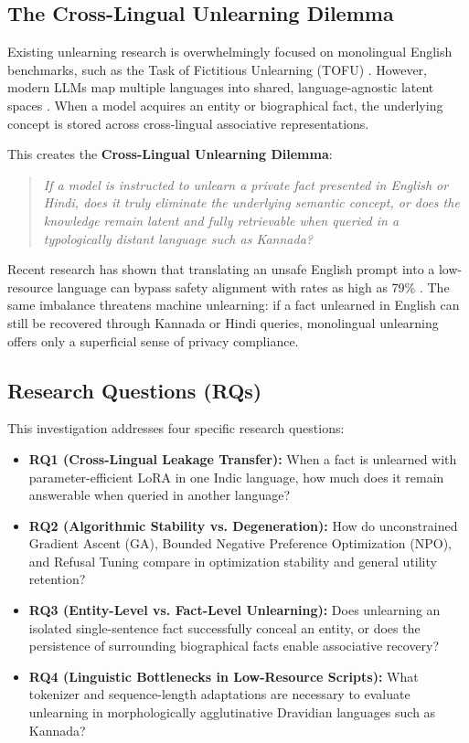 \documentclass[11pt,a4paper]{article}
\begin{document}
\subsection{The Cross-Lingual Unlearning Dilemma}
Existing unlearning research is overwhelmingly focused on monolingual English benchmarks, such as the Task of Fictitious Unlearning (TOFU) \cite{maini2024}. However, modern LLMs map multiple languages into shared, language-agnostic latent spaces \cite{conneau2020}. When a model acquires an entity or biographical fact, the underlying concept is stored across cross-lingual associative representations.

This creates the \textbf{Cross-Lingual Unlearning Dilemma}:
\begin{quote}
\textit{If a model is instructed to unlearn a private fact presented in English or Hindi, does it truly eliminate the underlying semantic concept, or does the knowledge remain latent and fully retrievable when queried in a typologically distant language such as Kannada?}
\end{quote}

Recent research has shown that translating an unsafe English prompt into a low-resource language can bypass safety alignment with rates as high as 79\% \cite{yong2023}. The same imbalance threatens machine unlearning: if a fact unlearned in English can still be recovered through Kannada or Hindi queries, monolingual unlearning offers only a superficial sense of privacy compliance.

\subsection{Research Questions (RQs)}
This investigation addresses four specific research questions:
\begin{itemize}
    \item \textbf{RQ1 (Cross-Lingual Leakage Transfer):} When a fact is unlearned with parameter-efficient LoRA in one Indic language, how much does it remain answerable when queried in another language?
    \item \textbf{RQ2 (Algorithmic Stability vs. Degeneration):} How do unconstrained Gradient Ascent (GA), Bounded Negative Preference Optimization (NPO), and Refusal Tuning compare in optimization stability and general utility retention?
    \item \textbf{RQ3 (Entity-Level vs. Fact-Level Unlearning):} Does unlearning an isolated single-sentence fact successfully conceal an entity, or does the persistence of surrounding biographical facts enable associative recovery?
    \item \textbf{RQ4 (Linguistic Bottlenecks in Low-Resource Scripts):} What tokenizer and sequence-length adaptations are necessary to evaluate unlearning in morphologically agglutinative Dravidian languages such as Kannada?
\end{itemize}
\end{document}
